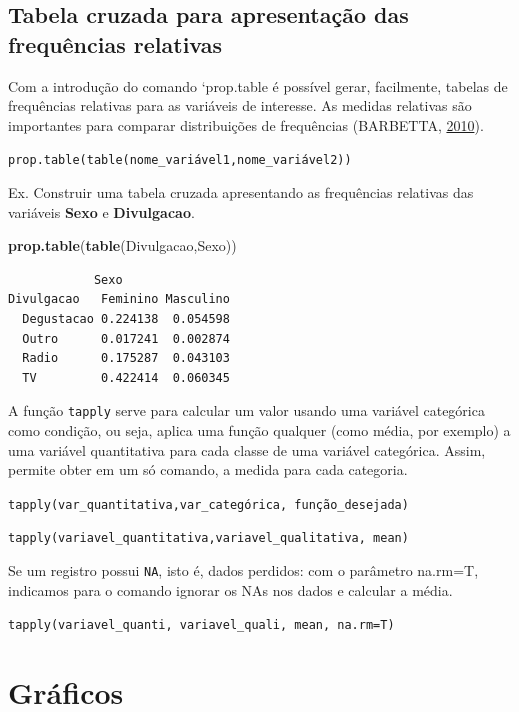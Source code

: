 \documentclass[12pt,brazil,]{book}
\newenvironment{Shaded}{\begin{snugshade}}{\end{snugshade}}
\newcommand{\KeywordTok}[1]{\textcolor[rgb]{0.13,0.29,0.53}{\textbf{#1}}}
\newcommand{\NormalTok}[1]{#1}
\begin{document}
\hypertarget{tabela-cruzada-para-apresentacao-das-frequencias-relativas}{%
\subsection{Tabela cruzada para apresentação das frequências
relativas}\label{tabela-cruzada-para-apresentacao-das-frequencias-relativas}}

Com a introdução do comando `prop.table\textbar{} é possível gerar,
facilmente, tabelas de frequências relativas para as variáveis de
interesse. As medidas relativas são importantes para comparar
distribuições de frequências (BARBETTA,
\protect\hyperlink{ref-barbetta1988}{2010}).

\texttt{prop.table(table(nome\_variável1,nome\_variável2))}

Ex. Construir uma tabela cruzada apresentando as frequências relativas
das variáveis \textbf{Sexo} e \textbf{Divulgacao}.

\begin{Shaded}
\begin{Highlighting}[]
\KeywordTok{prop.table}\NormalTok{(}\KeywordTok{table}\NormalTok{(Divulgacao,Sexo))}
\end{Highlighting}
\end{Shaded}

\begin{verbatim}
            Sexo
Divulgacao   Feminino Masculino
  Degustacao 0.224138  0.054598
  Outro      0.017241  0.002874
  Radio      0.175287  0.043103
  TV         0.422414  0.060345
\end{verbatim}

A função \texttt{tapply} serve para calcular um valor usando uma
variável categórica como condição, ou seja, aplica uma função qualquer
(como média, por exemplo) a uma variável quantitativa para cada classe
de uma variável categórica. Assim, permite obter em um só comando, a
medida para cada categoria.

\texttt{tapply(var\_quantitativa,var\_categórica,\ função\_desejada)}

\texttt{tapply(variavel\_quantitativa,variavel\_qualitativa,\ mean)}

Se um registro possui \texttt{NA}, isto é, dados perdidos: com o
parâmetro na.rm=T, indicamos para o comando ignorar os NAs nos dados e
calcular a média.

\texttt{tapply(variavel\_quanti,\ variavel\_quali,\ mean,\ na.rm=T)}

\hypertarget{graficos}{%
\section{Gráficos}\label{graficos}}
\end{document}
